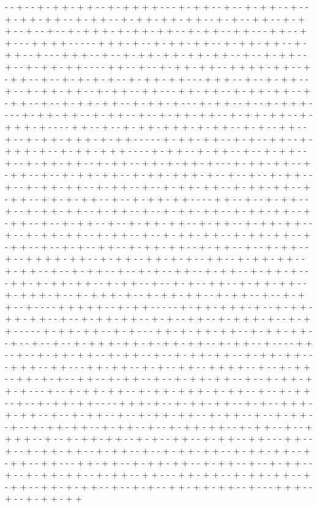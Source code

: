 - - + - - + - + + - + + - - + - + + + + - - - + - + + - - + - - + - + + - - + - - + - + + - + + - - + - + + - - + - + + - + + - + + - - + - + - - + + - - + - + + - - + - - + - - + - + + + - + - + + - + + - - + - + + - - + + - - - + + - - + + - - - + + + + - - - - - + + + - + - - + - + + - + + - - + - + + - + + - - + - + + - - + - - - + + + - - + - - + - + + - + + - + + - + + - - + - - + - + + - - + - - + - + + - + + - - - - + + - - + - - + - + + - + + - - + + + + - + + - - + - + + - - + - - + - + - + - + - - + - + + - + + - - - + + + - - + - - + - + + - - + - - + - + + - + + - - + - + + - - + + - - - + + - + + - - + - + + - + + - - + - + + - - + - - + - + + - + + - - + - + + - + - - - + - + + - - + - - + - + + + - - - - + - + + - + + - - + - + + - - + - - + - + + - + + - - + - + + - + + - - + - + + + - + - - - - + + - - + - - + - + + - + + + - + - + + - - + - + - - + + - - + - - + - + + - + + + - + - + + - - - - - + - + + - + + - - + - + - - + + - - + - + + + - + - - + - + + - + + + - - - - + - + + - - + - + + - - + - - + - + + - - + - - + - + + - + + - - + - + + - - + + - + - + + - + - - - + - + + - + + - - + - + + - - + - - + - + + - + + - - + - + + - + + + - + - - + - - + - - + - + + - - + - - + - + + - + + - - + - + + - - + - - + - + + - + + - - + - + + - + + - - + - + + - - + + - + - + + - - + - - + - + + - + + - - - - + + - - + - - + - + + - - + - - + - + + - + + - - + - + + - - + - - + - + + - + + - - + - + + - + + - - + - + + - - + - - + - + + - - + - - + - + + - + + - - + - + + - - + - + + - + + - - + - - + - + + - + + - - + - + + - - + - - + - + + - + + - - + - + + - + + - - + - + + - - + - - + - + - - + + - - + - + + - + + - - + - + + - - + - - + - + + - - + - - + + + + - + + - - + - + + - - + + - + - + - - + + - - + - + + - + + - - + - + + - - + - - + - + + - - + - - + - + - - + + - - + - + + - - + - + + - + - - - + + - + - + + - + + - - + - + + - - + - - + - + - - + + - - + - + + - + + - - + - + + + - + - - + - + + + - + - - + - + + - + + - - + - + + - - + - - + - + + - - + - - - - + + + + + - - + - + + - - - - - + - + + - + + + - + - - + - + + - + + - + + - - + - - + - + + - + + - - + - + - - + + - - + - + + + - + - - + - + + - - - - - + - + + - + + - - + - + - - - + + - + - + + - + + - - + - + + - + + - - + - - + - - + - - + - + + + - + + - + - + + - + + - - + - + + - - + - - - - + + - - + - - + - + + - + + - - + - + + - - + - - + - + + - + + - - + - + + - + + - - - + + + - - + + - - - + + - + + - - + - + - - + + - - + + + + - - + - - + - + + - - + + - + - + - - + + - - + - + + - - + - - + - + + - + + - - + - - + - + + - + + - + - - - + - - + - + + - + + - - + - + + - + + + - + - + + - - + - - + - + + - - + - - + - + + - + + - - - - + + + - + - - + - + + - + + - - + - + - - + + + - + - + + - - + - - + - + + - - + - - + - + + - + + - - + - + + - - + - - + - + + - - + - - + - + + - + + - - + - + + - - + - - + - + + - + + - - + - + + - - + - - + + + + - - + - - + - + + - + + - - + - + - - + + - - + - + + - - + + - - - + + - - + - - + - + + - + + - - + - + + - - + - - + - + + - + + - - + - + + - + + - - + - + + - - + + - - - + + - + + - - + - + + - + + - - + - + + - - + - - + - + + - - + - - + - + + - + + - - + - + + - - + + - - - + + - + + - - + - + + - + + - - + - + + - - + + - + - + + - - + - - + - + - - + + - + + - + + - - + - - - + + + - - + - - + - + + - + + 